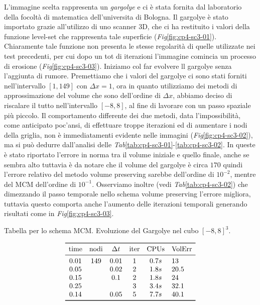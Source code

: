 L'immagine scelta rappresenta un \emph{gargolye} e ci è stata fornita
dal laboratorio della focoltà di matematica dell'universita di
Bologna. Il gargolye è stato importato grazie all'utilizzo di uno
scanner 3D, che ci ha restituito i valori della funzione level-set che
rappresenta tale superficie (\emph{Fig}\ref{fig:cp4-sc3-01}).  Chiaramente tale funzione non presenta le stesse regolarità di quelle utilizzate nei test
precedenti, per cui dopo un tot di iterazioni l'immagine comincia un
processo di erosione (\emph{Fig}\ref{fig:cp4-sc3-03}). Iniziamo col
far evolvere ll gargolye senza l'aggiunta di rumore. Premettiamo che i
valori del gargolye ci sono stati forniti nell'intervallo $[1,149]$ con
$\Delta x=1$, ora in quanto utilizziamo dei metodi di approssimazione
del volume che sono dell'ordine di $\Delta x$, abbiamo deciso di
riscalare il tutto nell'intervallo $[-8,8]$, al fine di lavorare con
un passo spaziale più piccolo. Il comportamento differente dei due metodi,
data l'impossibilità, come anticipato poc'ansi, di effettuare troppe
iterazioni ed di aumentare i nodi della griglia, non è immediatamenti
evidente nelle immagini (\emph{Fig}\ref{fig:cp4-sc3-02}), ma si può
dedurre dall'analisi delle
\emph{Tab}\ref{tab:cp4-sc3-01}-\ref{tab:cp4-sc3-02}. In queste è stato
riportato  l'errore in norma tra il volume iniziale e quello finale,
anche se sembra alto tuttavia è da notare che il volume del gargolye è
circa $170$ quindi l'errore relativo del metodo volume preserving
sarebbe dell'ordine di $10^{-2}$, mentre del MCM dell'ordine di
$10^{-1}$. Osserviamo inoltre (vedi \emph{Tab}\ref{tab:cp4-sc3-02})
che dimezzando il passo temporale nello schema volume preserving
l'errore migliora, tuttavia questo comporta anche l'aumento delle
iterazioni temporali generando risultati come in \emph{Fig}\ref{fig:cp4-sc3-03}.

\begin{table}[htb!]
\caption{Tabella per lo schema MCM. Evoluzione del Gargolye nel cubo
  $[-8,8]^3$.}
\label{tab:cp4-sc3-01}
\[
\begin{array}{*{5}{c}l}
    \toprule
    \text{time} &\text{nodi} &\Delta t &\text{iter} &\text{CPUs}&\text{VolErr} \\
    \midrule
     0.01       & 149        & 0.01    & 1          & 0.7s     &13\\
     0.05       &            & 0.02    & 2          & 1.8s     &20.5\\ 
     0.15       &            & 0.1     & 2          & 1.8s     &24\\ 
     0.25       &            &         & 3          & 3.4s     &32.1\\
     0.14       &            & 0.05    & 5          & 7.7s    &40.1\\     
     \bottomrule
\end{array}
\]
\end{table}

